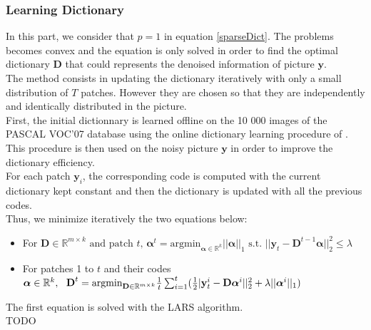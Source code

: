 \documentclass{ipol}
\newcommand{\psize}{m}
\newcommand{\dsize}{k}
\newcommand{\dict}{\textbf{D}}
\newcommand{\code}{\bm{\alpha}}
\newcommand{\pnorm}{p}
\newcommand{\noi}{\textbf{y}}
\newcommand{\RR}{\mathbb{R}}
\newcommand{\argmin}{\text{argmin}}
\begin{document}
\subsubsection{Learning Dictionary}

In this part, we consider that $\pnorm = 1$ in equation \eqref{sparseDict}. The problems becomes convex and the equation is only solved in order to find the optimal dictionary $\dict$ that could represents the denoised information of picture $\noi$.\\
The method consists in updating the dictionary iteratively with only a small distribution of $T$ patches. However they are chosen so that they are independently and identically distributed in the picture.\\
First, the initial dictionnary is learned offline on the 10 000 images of the PASCAL VOC'07 database using the  online dictionary learning procedure of \cite{onlineLearning}. This procedure is then used on the noisy picture $\noi$ in order to improve the dictionary efficiency.\\
For each patch $\noi_i$, the corresponding code is computed with the current dictionary kept constant and then the dictionary is updated with all the previous codes.\\
Thus, we minimize iteratively the two equations below:
\begin{itemize}
	\item For $\dict \in \RR^{\psize \times \dsize} \text{ and patch $t$, } \code^t = \argmin_{\code \in \RR^\dsize} ||\code||_1 \text{ s.t. } ||\noi_t - \dict^{t-1} \code||_2^2 \leq \lambda$
	\item For patches 1 to $t$ and their codes $\code \in \RR^\dsize, \ \ \dict^{t}= \argmin_{\dict \in \RR^{\psize \times \dsize}} \frac{1}{t} \sum_{i=1}^t (\frac{1}{2}|\textbf{\noi}_t^i - \dict \code^i||^2_2 + \lambda ||\code^i||_1)$
\end{itemize}
The first equation is solved with the LARS algorithm.\\
TODO
\end{document}
